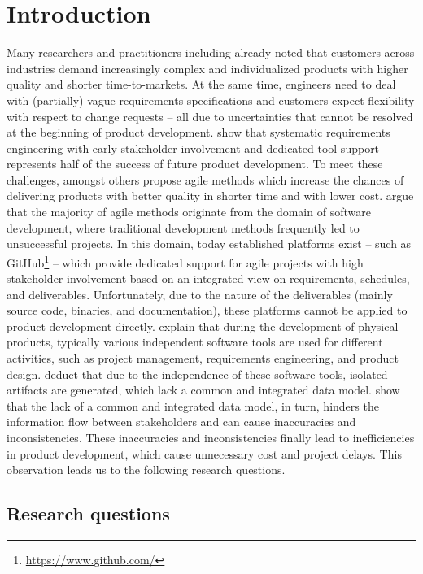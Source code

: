 \section{Introduction}
\label{sec:introduction}

Many researchers and practitioners including \cite{Ahti2005} already noted that customers across industries demand increasingly complex and individualized products with higher quality and shorter time-to-markets.
At the same time, engineers need to deal with (partially) vague requirements specifications and customers expect flexibility with respect to change requests -- all due to uncertainties that cannot be resolved at the beginning of product development.
\cite{6226784} show that systematic requirements engineering with early stakeholder involvement and dedicated tool support represents half of the success of future product development.
To meet these challenges, amongst others \cite{ozkan2019agile} propose agile methods which increase the chances of delivering products with better quality in shorter time and with lower cost. 
\cite{HEIMICKE2021786} argue that the majority of agile methods originate from the domain of software development, where traditional development methods frequently led to unsuccessful projects.
In this domain, today established platforms exist -- such as GitHub\footnote{\url{https://www.github.com/}} -- which provide dedicated support for agile projects with high stakeholder involvement based on an integrated view on requirements, schedules, and deliverables.
Unfortunately, due to the nature of the deliverables (mainly source code, binaries, and documentation), these platforms cannot be applied to product development directly. 
\cite{MarionTucker} explain that during the development of physical products, typically various independent software tools are used for different activities, such as project management, requirements engineering, and product design.
\cite{houshmand2010collaborative} deduct that due to the independence of these software tools, isolated artifacts are generated, which lack a common and integrated data model.
\cite{Jorma2014} show that the lack of a common and integrated data model, in turn, hinders the information flow between stakeholders and can cause inaccuracies and inconsistencies.
These inaccuracies and inconsistencies finally lead to inefficiencies in product development, which cause unnecessary cost and project delays.
This observation leads us to the following research questions.

\subsection{Research questions}

